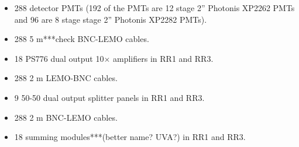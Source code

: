 \documentclass[oneside]{book}   %
\begin{document}
\begin{itemize}\itemsep6pt \parskip0pt 
	\item 288 detector PMTs (192 of the PMTs are 12 stage 2'' Photonis XP2262 PMTs and 96 are 8 stage stage 2'' Photonis XP2282 PMTs).
	\item 288 5 m***check BNC-LEMO cables. 
	\item 18 PS776 dual output 10$\times$ amplifiers in RR1 and RR3.
	\item 288 2 m LEMO-BNC cables. 
	\item 9 50-50 dual output splitter panels in RR1 and RR3. 
	\item 288 2 m BNC-LEMO cables.
	\item 18 summing modules***(better name? UVA?) in RR1 and RR3.
\end{itemize}



\end{document}
